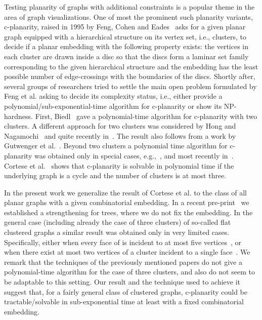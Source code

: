 \documentclass{llncs}
\def\cNP{\hbox{\rm \sffamily NP}}
\begin{document}
Testing planarity of graphs with additional constraints is a popular theme in
the area of graph visualizations.
One of most the prominent such planarity variants, c-planarity, raised in 1995 by Feng, Cohen and Eades~\cite{FCEa95,FCEb95} 
asks for a given planar graph  equipped with a hierarchical structure on its vertex 
set, i.e., clusters, to decide if a planar embedding  with the following property exists:
the vertices in each cluster are drawn inside a disc so that the discs
form a laminar set family corresponding to the given hierarchical structure
and the embedding has the least possible number of edge-crossings with the boundaries of the discs.
Shortly after, several groups of researchers tried to settle
the main open problem formulated by Feng et al. asking to decide its complexity
status, i.e., either provide
a polynomial/sub-exponential-time  algorithm for c-planarity or show its \cNP-hardness.
First, Biedl~\cite{B98} gave
 a polynomial-time algorithm for c-planarity with two clusters. A different approach
for two clusters was considered by Hong and Nagamochi~\cite{HN16}
and quite recently in~\cite{FKMP15}.
 The result also follows from a work by Gutwenger et al.~\cite{GJL+02}.
Beyond two clusters a polynomial time algorithm for c-planarity was obtained only in special cases,
e.g.,~\cite{BFPP08,GLS05,GJL+02,JJK+09,JKK+09}, and most recently in~\cite{BR14+,CBFK14+}. Cortese et al.~\cite{CDPP05} shows that c-planarity is solvable in polynomial
time if the underlying  graph is a cycle and the number of clusters
is at most three.

 In the present work we generalize the result of Cortese et al. to the class of all planar graphs
with a given combinatorial embedding. In a recent pre-print~\cite{F14+} we established 
a strengthening for trees, where we do not fix the embedding.
In the general case (including already the case of three clusters) of so-called flat clustered graphs a similar result was obtained
only in very limited cases. Specifically, either when every face of  is incident
to at most five vertices~\cite{BF07,FKMP15}, or when there exist at most two vertices of a cluster incident to a single face~\cite{CBFK14+}.
We remark that the techniques of the previously mentioned papers do not give
a polynomial-time algorithm for the case of three clusters, and also do not seem to be adaptable
to this setting. Our result and the technique used to achieve it suggest that, for a fairly general class of clustered graphs, c-planarity could be tractable/solvable in  sub-exponential time at least with a fixed combinatorial embedding. 
\end{document}
